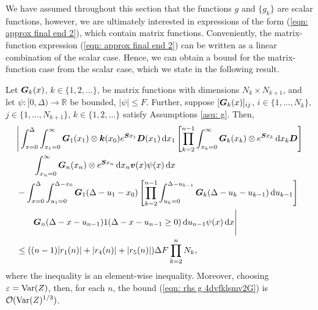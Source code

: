 We have assumed throughout this section that the functions \(g\) and \(\{g_k\}\) are scalar functions, however, we are ultimately interested in expressions of the form (\ref{eqn: approx final end 2}), which contain matrix functions. Conveniently, the matrix-function expression (\ref{eqn: approx final end 2}) can be written as a linear combination of the scalar case. Hence, we can obtain a bound for the matrix-function case from the scalar case, which we state in the following result.
\begin{lem}\label{lem: boobies}
	Let \(\boldsymbol G_k(x)\), \(k\in\{1,2,...\}\), be matrix functions with dimensions \(N_k \times N_{k+1}\), and let \(\psi:[0,\Delta)\to\mathbb R\) be bounded, \(|\psi|\leq F\). Further, suppose \([\boldsymbol G_k(x)]_{ij}\), \(i\in\{1,...,N_{k}\}\), \(j\in\{1,...,N_{k+1}\}\), \(k\in\{1,2,...\}\) satisfy Assumptions \ref{asu: g}. Then, 
	\begin{align}
		&\Bigg| \int_{x=0}^\Delta \int_{x_1=0}^\infty \boldsymbol G_1(x_1) \otimes \boldsymbol k(x_0) e^{\boldsymbol{S}x_1} \boldsymbol D (x_1) \, \mathrm{d} x_1
		\left[\prod_{k=2}^{n-1}\int_{x_k=0}^\infty \boldsymbol G_{k }(x_k) \otimes e^{\boldsymbol{S}x_k} \, \mathrm{d} x_k \boldsymbol D\right] \nonumber
\\&\qquad{}\int_{x_n=0}^\infty \boldsymbol G_{n }(x_n)\otimes e^{\boldsymbol{S}x_n} \, \mathrm{d} x_n {\boldsymbol v}(x) \psi(x) \, \mathrm{d} x \nonumber 
		\\&{}- \int_{x=0}^\Delta \int_{u_1=0}^{\Delta-x_0}\boldsymbol G_1(\Delta - u_1 - x_0)
		\left[\prod_{k=2}^{n-1} \int_{u_k=0}^{\Delta-u_{k-1}} \boldsymbol G_{k}(\Delta-u_k-u_{k-1})\, \mathrm{d} u_{k-1}\right] \nonumber 
				\\&\qquad{} \boldsymbol G_{n }(\Delta - x-u_{n-1})
			1(\Delta-x-u_{n-1}\geq0) \, \mathrm{d} u_{n-1}\psi(x) \, \mathrm{d} x \Bigg| \nonumber
		\\&\leq ((n-1)|r_1(n)| + |r_4(n)| + |r_5(n)|)\Delta F \prod_{k=2}^{n}N_{k}, \label{eqn: rhs g 4dvfklsmv2G}
	\end{align}
	where the inequality is an element-wise inequality. Moreover, choosing \(\varepsilon=\mathrm{Var}(Z)\), then, for each \(n\), the bound (\ref{eqn: rhs g 4dvfklsmv2G}) is \(\mathcal O(\mathrm{Var}(Z)^{1/3})\). 
\end{lem}
